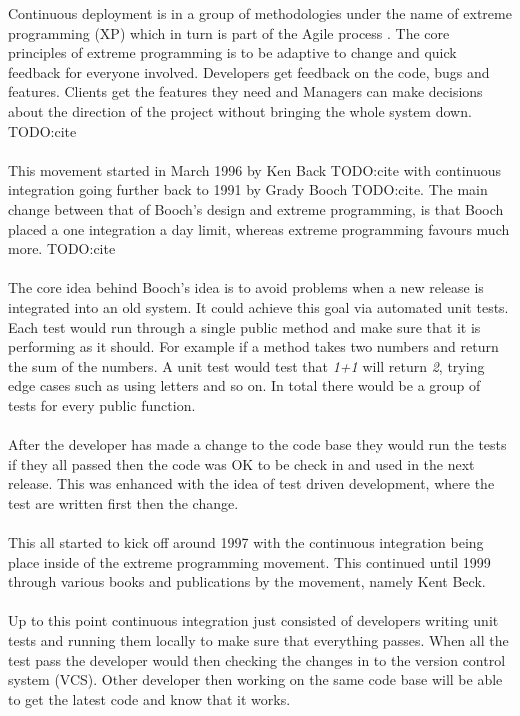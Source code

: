Continuous deployment is in a group of methodologies under the name of extreme programming (XP) which in turn is part of the Agile process \cite{XP}. The core principles of extreme programming is to be adaptive to change and quick feedback for everyone involved. Developers get feedback on the code, bugs and features. Clients get the features they need and Managers can make decisions about the direction of the project without bringing the whole system down. TODO:cite
\\\\
This movement started in March 1996 by Ken Back TODO:cite with continuous integration going further back to 1991 by Grady Booch TODO:cite. The main change between that of Booch's design and extreme programming, is that Booch placed a one integration a day limit, whereas extreme programming favours much more. TODO:cite
\\\\
The core idea behind Booch's idea is to avoid problems when a new release is integrated into an old system. It could achieve this goal via automated unit tests. Each test would run through a single public method and make sure that it is performing as it should. For example if a method takes two numbers and return the sum of the numbers. A unit test would test that \textit{1+1} will return \textit{2}, trying edge cases such as using letters and so on. In total there would be a group of tests for every public function. 
\\\\
After the developer has made a change to the code base they would run the tests if they all passed then the code was OK to be check in and used in the next release. This was enhanced with the idea of test driven development, where the test are written first then the change.
\\\\
This all started to kick off around 1997 with the continuous integration being place inside of the extreme programming movement.  This continued until 1999 through various books and publications by the movement, namely Kent Beck.
\\\\
Up to this point continuous integration just consisted of developers writing unit tests and running them locally to make sure that everything passes. When all the test pass the developer would then   checking the changes in to the version control system (VCS). Other developer then working on the same code base will be able to get the latest code and know that it works.
